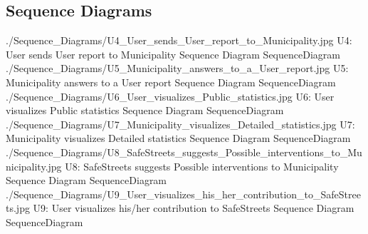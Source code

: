 \documentclass[../../../rasd.tex]{subfiles}
\begin{document}
\subsection{Sequence Diagrams\label{sect:3.2.4}}

\image {10cm} {./Sequence_Diagrams/U4_User_sends_User_report_to_Municipality.jpg} {U4: User sends User report to Municipality Sequence Diagram} {SequenceDiagram}
\image {8cm} {./Sequence_Diagrams/U5_Municipality_answers_to_a_User_report.jpg} {U5: Municipality answers to a User report Sequence Diagram} {SequenceDiagram}
\image {7cm} {./Sequence_Diagrams/U6_User_visualizes_Public_statistics.jpg} {U6: User visualizes Public statistics Sequence Diagram} {SequenceDiagram}
\image {8cm} {./Sequence_Diagrams/U7_Municipality_visualizes_Detailed_statistics.jpg} {U7: Municipality visualizes Detailed statistics Sequence Diagram} {SequenceDiagram}
\image {5cm} {./Sequence_Diagrams/U8_SafeStreets_suggests_Possible_interventions_to_Municipality.jpg} {U8: SafeStreets suggests Possible interventions to Municipality Sequence Diagram} {SequenceDiagram}
\image {6cm} {./Sequence_Diagrams/U9_User_visualizes_his_her_contribution_to_SafeStreets.jpg} {U9: User visualizes his/her contribution to SafeStreets Sequence Diagram} {SequenceDiagram} 
\end{document}
